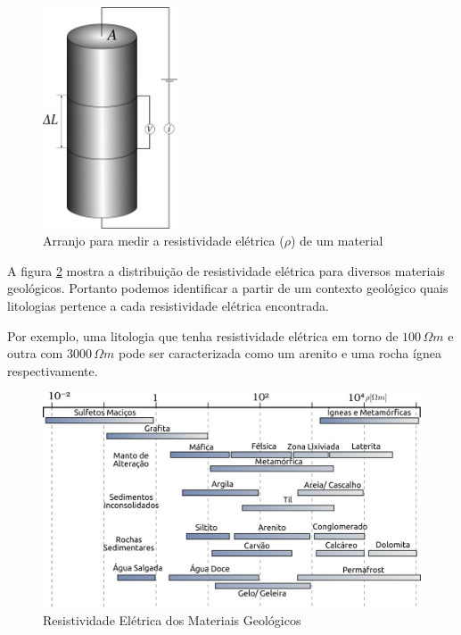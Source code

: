     
    \begin{figure}[h]
        \centering
        \caption{Arranjo para medir a resistividade elétrica ($\rho$) de um material}
        \centerline{\includegraphics[width=4cm]{texto/fig/resisti_telford.png}}
        \label{fig_resistividade}
    \end{figure}
    
    A figura \ref{tabela_resistividade} mostra a distribuição de resistividade elétrica para diversos materiais geológicos. 
    Portanto podemos identificar a partir de um contexto geológico quais litologias pertence a cada resistividade elétrica encontrada.
    
    Por exemplo, uma litologia que tenha resistividade elétrica em torno de  $100 \, \Omega m$ e outra com $3000 \, \Omega m $ pode ser caracterizada como um arenito e uma rocha ígnea respectivamente. 
    
    \begin{figure}[h]
        \centering
        \caption{Resistividade Elétrica dos Materiais Geológicos}
        \centerline{\includegraphics[width=14cm]{texto/fig/resistividade_tabela.png}}
        \label{tabela_resistividade}
    \end{figure}
    
